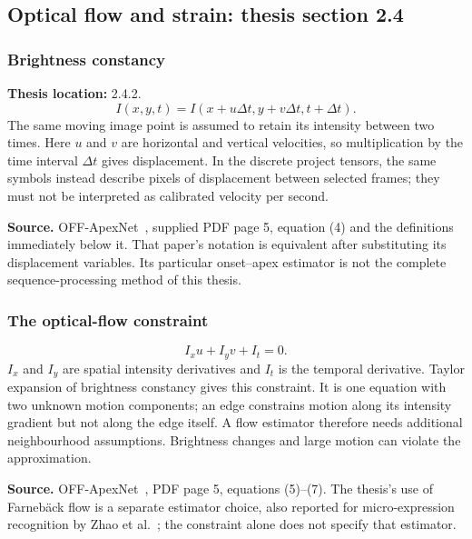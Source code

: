 \documentclass[11pt,a4paper]{article}
\numberwithin{equation}{section}
\begin{document}
\subsection{Optical flow and strain: thesis section 2.4}

\subsubsection{Brightness constancy}
\label{fg:flow}
\textbf{Thesis location:} 2.4.2.
\begin{equation}
    I(x,y,t)=I(x+u\Delta t,y+v\Delta t,t+\Delta t).
    \label{fg:eq:brightness}
\end{equation}
The same moving image point is assumed to retain its intensity between two
times. Here $u$ and $v$ are horizontal and vertical velocities, so multiplication
by the time interval $\Delta t$ gives displacement. In the discrete project
tensors, the same symbols instead describe pixels of displacement between
selected frames; they must not be interpreted as calibrated velocity per second.

\textbf{Source.} OFF-ApexNet~\cite{liong2019a}, supplied PDF page 5,
equation (4) and the definitions immediately below it. That paper's notation is
equivalent after substituting its displacement variables. Its particular
onset--apex estimator is not the complete sequence-processing method of this thesis.

\subsubsection{The optical-flow constraint}
\begin{equation}
    I_xu+I_yv+I_t=0.
    \label{fg:eq:flow-constraint}
\end{equation}
$I_x$ and $I_y$ are spatial intensity derivatives and $I_t$ is the temporal
derivative. Taylor expansion of brightness constancy gives this constraint.
It is one equation with two unknown motion components; an edge constrains
motion along its intensity gradient but not along the edge itself. A flow
estimator therefore needs additional neighbourhood assumptions. Brightness
changes and large motion can violate the approximation.

\textbf{Source.} OFF-ApexNet~\cite{liong2019a}, PDF page 5,
equations (5)--(7). The thesis's use of Farneb\"ack flow is a separate estimator
choice, also reported for micro-expression recognition by Zhao
et al.~\cite{zhaoS2021}; the constraint alone does not specify that estimator.
\end{document}
